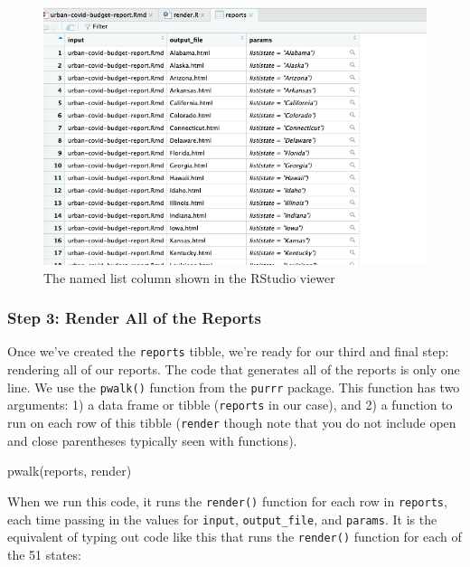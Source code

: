 \documentclass[
]{book}
\newenvironment{Shaded}{\begin{snugshade}}{\end{snugshade}}
\newcommand{\FunctionTok}[1]{\textcolor[rgb]{0.00,0.00,0.00}{#1}}
\newcommand{\NormalTok}[1]{#1}
\begin{document}
\begin{figure}
\includegraphics[width=1\linewidth]{assets/params-named-list} \caption{The named list column shown in the RStudio viewer}\label{fig:params-named-list}
\end{figure}

\hypertarget{step-3-render-all-of-the-reports}{%
\subsubsection*{Step 3: Render All of the Reports}\label{step-3-render-all-of-the-reports}}

Once we've created the \texttt{reports} tibble, we're ready for our third and final step: rendering all of our reports. The code that generates all of the reports is only one line. We use the \texttt{pwalk()} function from the \texttt{purrr} package. This function has two arguments: 1) a data frame or tibble (\texttt{reports} in our case), and 2) a function to run on each row of this tibble (\texttt{render} though note that you do not include open and close parentheses typically seen with functions).

\begin{Shaded}
\begin{Highlighting}[]
\FunctionTok{pwalk}\NormalTok{(reports, render)}
\end{Highlighting}
\end{Shaded}

When we run this code, it runs the \texttt{render()} function for each row in \texttt{reports}, each time passing in the values for \texttt{input}, \texttt{output\_file}, and \texttt{params}. It is the equivalent of typing out code like this that runs the \texttt{render()} function for each of the 51 states:
\end{document}
